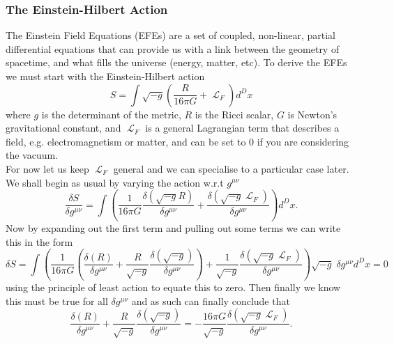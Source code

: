 \documentclass[12pt]{article}
\numberwithin{equation}{section}
\DeclareMathOperator{\Lagr}{\mathcal{L}}
\numberwithin{figure}{section}
\begin{document}
\subsubsection{The Einstein-Hilbert Action} %
\label{subsub:the_einstein-hilbert_action}
The Einstein Field Equations (EFEs) are a set of coupled, non-linear, partial differential equations that can provide us with a link between the geometry of spacetime, and what fills the universe (energy, matter, etc). To derive the EFEs we must start with the Einstein-Hilbert action
\begin{equation}
	\label{eq:HE_action}
	S = \int \sqrt{-g} \left(\frac{R}{16\pi G} + \Lagr_F\right)d^Dx
\end{equation}
where $g$ is the determinant of the metric, $R$ is the Ricci scalar, $G$ is Newton's gravitational constant, and $\Lagr_F$ is a general Lagrangian term that describes a field, e.g. electromagnetism or matter, and can be set to 0 if you are considering the vacuum.\\
For now let us keep $\Lagr_F$ general and we can specialise to a particular case later. We shall begin as usual by varying the action w.r.t $g^{\mu\nu}$
\begin{equation}
	\frac{\delta S}{\delta g^{\mu\nu}} = \int \left(\frac{1}{16\pi G} \frac{\delta(\sqrt{-g}R)}{\delta g^{\mu\nu}} + \frac{\delta(\sqrt{-g}\Lagr_F)}{\delta g^{\mu\nu}}\right)d^Dx.
\end{equation}
Now by expanding out the first term and pulling out some terms we can write this in the form
\begin{equation}
	{\delta S} = \int \left(\frac{1}{16\pi G} \left(\frac{\delta(R)}{\delta g^{\mu\nu}} + \frac{R}{\sqrt{-g}}\frac{\delta(\sqrt{-g})}{\delta g^{\mu\nu}}\right) + \frac{1}{\sqrt{-g}}\frac{\delta(\sqrt{-g}\Lagr_F)}{\delta g^{\mu\nu}}\right)\sqrt{-g}\;\delta g^{\mu\nu} d^Dx = 0
\end{equation}
using the principle of least action to equate this to zero. Then finally we know this must be true for all $\delta g^{\mu\nu}$ and as such can finally conclude that
\begin{equation}
	\frac{\delta(R)}{\delta g^{\mu\nu}} + \frac{R}{\sqrt{-g}}\frac{\delta(\sqrt{-g})}{\delta g^{\mu\nu}} = -\frac{16\pi G}{\sqrt{-g}}\frac{\delta(\sqrt{-g}\Lagr_F)}{\delta g^{\mu\nu}}. \label{eq:EFE_unfinished}
\end{equation}
\end{document}
